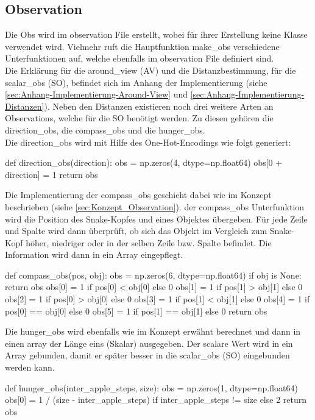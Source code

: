 \subsection{Observation} \label{sec:Implementierung_Observation}
Die Obs wird im observation File erstellt, wobei für ihrer Erstellung keine Klasse verwendet wird. Vielmehr ruft die Hauptfunktion make\_obs verschiedene Unterfunktionen auf, welche ebenfalls im observation File definiert sind.\\
Die Erklärung für die around\_view (AV) und die Distanzbestimmung, für die scalar\_obs (SO), befindet sich im Anhang der Implementierung (siehe \ref{sec:Anhang-Implementierung-Around-View} und \ref{sec:Anhang-Implementierung-Distanzen}).
Neben den Distanzen existieren noch drei weitere Arten an Observations, welche für die SO benötigt werden. Zu diesen gehören die direction\_obs, die compass\_obs und die hunger\_obs.\\
Die direction\_obs wird mit Hilfe des One-Hot-Encodings wie folgt generiert:
\begin{python}
	def direction_obs(direction):
		obs = np.zeros(4, dtype=np.float64)
		obs[0 + direction] = 1
		return obs
\end{python}
Die Implementierung der compass\_obs geschieht dabei wie im Konzept beschrieben (siehe \ref{sec:Konzept_Observation}). der compass\_obs Unterfunktion wird die Position des Snake-Kopfes und eines Objektes übergeben. Für jede Zeile und Spalte wird dann überprüft, ob sich das Objekt im Vergleich zum Snake-Kopf höher, niedriger oder in der selben Zeile bzw. Spalte befindet. Die Information wird dann in ein Array eingepflegt.
\begin{python}
	def compass_obs(pos, obj):
		obs = np.zeros(6, dtype=np.float64)
		if obj is None:
			return obs
		obs[0] = 1 if pos[0] < obj[0] else 0
		obs[1] = 1 if pos[1] > obj[1] else 0
		obs[2] = 1 if pos[0] > obj[0] else 0
		obs[3] = 1 if pos[1] < obj[1] else 0
		obs[4] = 1 if pos[0] == obj[0] else 0
		obs[5] = 1 if pos[1] == obj[1] else 0
		return obs
\end{python}
Die hunger\_obs wird ebenfalls wie im Konzept erwähnt berechnet und dann in einen array der Länge eins (Skalar) ausgegeben. Der scalare Wert wird in ein Array gebunden, damit er später besser in die scalar\_obs (SO) eingebunden werden kann.
\begin{python}
	def hunger_obs(inter_apple_steps, size):
		obs = np.zeros(1, dtype=np.float64)
		obs[0] = 1 / (size - inter_apple_steps) if inter_apple_steps != size else 2
		return obs
\end{python}
